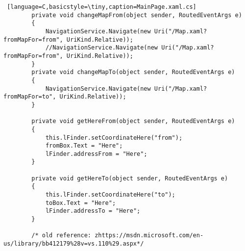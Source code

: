 \begin{lstlisting} [language=C,basicstyle=\tiny,caption=MainPage.xaml.cs]
        private void changeMapFrom(object sender, RoutedEventArgs e)
        {
            NavigationService.Navigate(new Uri("/Map.xaml?fromMapFor=from", UriKind.Relative));
            //NavigationService.Navigate(new Uri("/Map.xaml?fromMapFor=from", UriKind.Relative));    
        }
        private void changeMapTo(object sender, RoutedEventArgs e)
        {
            NavigationService.Navigate(new Uri("/Map.xaml?fromMapFor=to", UriKind.Relative));    
        }

        private void getHereFrom(object sender, RoutedEventArgs e)
        {
            this.lFinder.setCoordinateHere("from");
            fromBox.Text = "Here";
            lFinder.addressFrom = "Here";
        }

        private void getHereTo(object sender, RoutedEventArgs e)
        {
            this.lFinder.setCoordinateHere("to");
            toBox.Text = "Here";
            lFinder.addressTo = "Here";
        }

        /* old reference: zhttps://msdn.microsoft.com/en-us/library/bb412179%28v=vs.110%29.aspx*/


\end{lstlisting}
